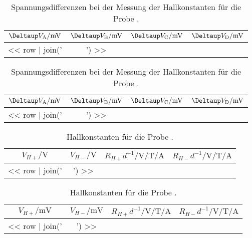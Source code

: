 \begin{table}[htbp]
    \centering
    \begin{tabular}{SSSS}
        {$\Deltaup V_\text{A} / \si{\milli\volt}$} &
        {$\Deltaup V_\text{B} / \si{\milli\volt}$} &
        {$\Deltaup V_\text{C} / \si{\milli\volt}$} &
        {$\Deltaup V_\text{D} / \si{\milli\volt}$} \\
        \midrule
        << row | join(' & ') >> \\
    \end{tabular}
    \caption{%
        Spannungsdifferenzen bei der Messung der Hallkonstanten für die Probe
        \probeA.
    }
    \label{tab:A:V_ABCD}
\end{table}

\begin{table}[htbp]
    \centering
    \begin{tabular}{SSSS}
        {$\Deltaup V_\text{A} / \si{\milli\volt}$} &
        {$\Deltaup V_\text{B} / \si{\milli\volt}$} &
        {$\Deltaup V_\text{C} / \si{\milli\volt}$} &
        {$\Deltaup V_\text{D} / \si{\milli\volt}$} \\
        \midrule
        << row | join(' & ') >> \\
    \end{tabular}
    \caption{%
        Spannungsdifferenzen bei der Messung der Hallkonstanten für die Probe
        \probeB.
    }
    \label{tab:B:V_ABCD}
\end{table}

\begin{table}[htbp]
    \centering
    \begin{tabular}{SS|SS}
        {$V_{H+} / \si\volt$} &
        {$V_{H-} / \si\volt$} &
        {$R_{H+} d^{-1} / \si{\volt\per\tesla\per\ampere}$} &
        {$R_{H-} d^{-1} / \si{\volt\per\tesla\per\ampere}$} \\
        \midrule
        << row | join(' & ') >> \\
    \end{tabular}
    \caption{%
        Hallkonstanten für die Probe \probeA.
    }
    \label{tab:A:VH+-,RH+-}
\end{table}

\begin{table}[htbp]
    \centering
    \begin{tabular}{SSSS}
        {$V_{H+} / \si{\milli\volt}$} &
        {$V_{H-} / \si{\milli\volt}$} &
        {$R_{H+} d^{-1} / \si{\volt\per\tesla\per\ampere}$} &
        {$R_{H-} d^{-1} / \si{\volt\per\tesla\per\ampere}$} \\
        \midrule
        << row | join(' & ') >> \\
    \end{tabular}
    \caption{%
        Hallkonstanten für die Probe \probeB.
    }
    \label{tab:B:VH+-,RH+-}
\end{table}

